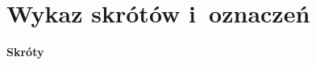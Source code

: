 \documentclass[polish,master,a4paper,oneside]{ppfcmthesis}
\renewcommand{\_}{\origtextunderscore\ifmmode\else\allowbreak\fi}
\begin{document}
\cleardoublepage
\pagestyle{ppfcmthesis}%
\tableofcontents*
\cleardoublepage

\chapter*{Wykaz skrótów i~oznaczeń}

\noindent\textbf{Skróty}
\vspace{0.5em}
\end{document}
